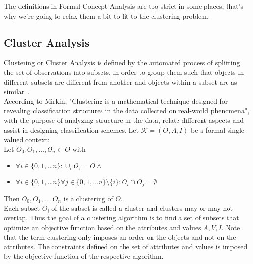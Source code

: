 The definitions in Formal Concept Analysis are too strict in some places, that's why we're going to relax them a bit to fit to the clustering problem.~\cite{ignatov2012concept}

\subsection{Cluster Analysis}\label{\positionnumber}
Clustering or Cluster Analysis is defined by the automated process of splitting the set of observations into subsets, in order to group them such that objects in different subsets are different from another and objects within a subset are as similar~\cite{han2011data}. \\
According to Mirkin, "Clustering is a mathematical technique designed for revealing classification structures in the data collected on real-world phenomena"\cite{mirkin2013mathematical}, with the purpose of analyzing structure in the data, relate different aspects and assist in designing classification schemes. 
Let $\mathcal{K} = (O, A, I)$  be a formal single-valued context: \\
Let $O_0, O_1, \dots, O_n \subset O$ with
\begin{itemize}
    \item $\forall i \in \{0, 1, \dots n\}: \cup_i O_i = O \wedge$
    \item $\forall i \in \{0, 1, \dots n\} \forall j \in \{0, 1, \dots n\}\setminus\{i\}: O_i \cap O_j =\emptyset$
\end{itemize}
Then $O_0, O_1, \dots, O_n$ is a clustering of $O$. \\
Each subset $O_i$ of the subset is called a cluster and clusters may or may not overlap. Thus the goal of a clustering algorithm is to find a set of subsets that optimize an objective function based on the attributes and values $A,V,I$. Note that the term clustering only imposes an order on the objects and not on the attributes. The constraints defined on the set of attributes and values is imposed by the objective function of the respective algorithm. \\

